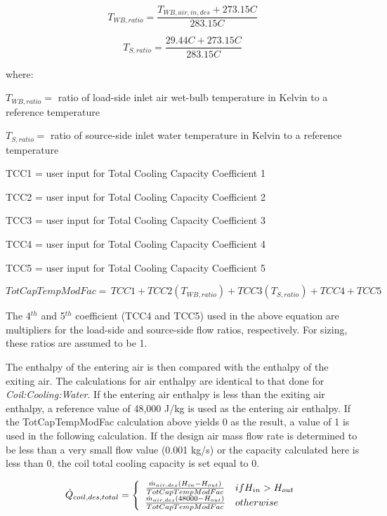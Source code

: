 \begin{equation}
  T_{WB,ratio} = \frac{T_{WB,air,in,des}+273.15C}{283.15C}
\end{equation}

\begin{equation}
  T_{S,ratio} = \frac{29.44C+273.15C}{283.15C}
\end{equation}

where:

$T_{WB,ratio} = $ ratio of load-side inlet air wet-bulb temperature in Kelvin to a reference temperature

$T_{S,ratio} = $ ratio of source-side inlet water temperature in Kelvin to a reference temperature

TCC1 = user input for Total Cooling Capacity Coefficient 1

TCC2 = user input for Total Cooling Capacity Coefficient 2

TCC3 = user input for Total Cooling Capacity Coefficient 3

TCC4 = user input for Total Cooling Capacity Coefficient 4

TCC5 = user input for Total Cooling Capacity Coefficient 5

\begin{equation}
TotCapTempModFac = \,TCC1 + TCC2\left( {{T_{WB,ratio}}} \right) + TCC3\left( {{T_{S,ratio}}} \right) + TCC4 + TCC5
\end{equation}

The 4\(^{th}\) and 5\(^{th}\) coefficient (TCC4 and TCC5) used in the above equation are multipliers for the load-side and source-side flow ratios, respectively. For sizing, these ratios are assumed to be 1.

The enthalpy of the entering air is then compared with the enthalpy of the exiting air. The calculations for air enthalpy are identical to that done for \emph{Coil:Cooling:Water}. If the entering air enthalpy is less than the exiting air enthalpy, a reference value of 48,000 J/kg is used as the entering air enthalpy. If the TotCapTempModFac calculation above yields 0 as the result, a value of 1 is used in the following calculation. If the design air mass flow rate is determined to be less than a very small flow value (0.001 kg/s) or the capacity calculated here is less than 0, the coil total cooling capacity is set equal to 0.

\begin{equation}
  \dot{Q}_{coil,des,total}   = \left\{
                                  \begin{array}{cl}
                                    \frac{\dot{m}_{air,des}\PB{H_{in}-H_{out}}}{TotCapTempModFac}  & if H_{in}>H_{out} \\
                                    \frac{\dot{m}_{air,des}\PB{48000 -H_{out}}}{TotCapTempModFac}  & otherwise
                                  \end{array}
                                \right.
\end{equation}

